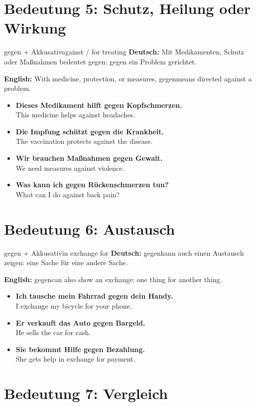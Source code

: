 \documentclass[a4paper,11pt]{article}
\newcommand{\GermanText}[1]{\textbf{Deutsch: }#1\par}
\newcommand{\EnglishText}[1]{{\small\color{SoftGray}\textbf{English: }#1\par}}
\newcommand{\ExampleItem}[2]{\item \textbf{#1}\\{\small\color{SoftGray}#2}}
\begin{document}
\section{Bedeutung 5: Schutz, Heilung oder Wirkung}

\begin{grammarentry}{gegen + Akkusativ}{against / for treating}
\GermanText{Mit Medikamenten, Schutz oder Maßnahmen bedeutet \glqq gegen\grqq: gegen ein Problem gerichtet.}
\EnglishText{With medicine, protection, or measures, \glqq gegen\grqq means directed against a problem.}
\end{grammarentry}

\begin{exbox}
\begin{itemize}
    \ExampleItem{Dieses Medikament hilft gegen Kopfschmerzen.}{This medicine helps against headaches.}
    \ExampleItem{Die Impfung schützt gegen die Krankheit.}{The vaccination protects against the disease.}
    \ExampleItem{Wir brauchen Maßnahmen gegen Gewalt.}{We need measures against violence.}
    \ExampleItem{Was kann ich gegen Rückenschmerzen tun?}{What can I do against back pain?}
\end{itemize}
\end{exbox}

\section{Bedeutung 6: Austausch}

\begin{grammarentry}{gegen + Akkusativ}{in exchange for}
\GermanText{\glqq gegen\grqq kann auch einen Austausch zeigen: eine Sache für eine andere Sache.}
\EnglishText{\glqq gegen\grqq can also show an exchange: one thing for another thing.}
\end{grammarentry}

\begin{exbox}
\begin{itemize}
    \ExampleItem{Ich tausche mein Fahrrad gegen dein Handy.}{I exchange my bicycle for your phone.}
    \ExampleItem{Er verkauft das Auto gegen Bargeld.}{He sells the car for cash.}
    \ExampleItem{Sie bekommt Hilfe gegen Bezahlung.}{She gets help in exchange for payment.}
\end{itemize}
\end{exbox}

\section{Bedeutung 7: Vergleich}
\end{document}
